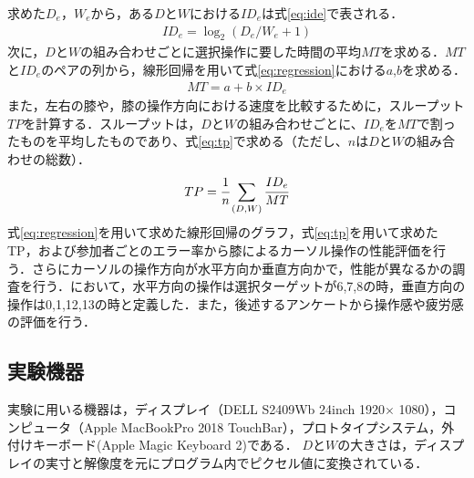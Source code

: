 \documentclass[submit, techrep]{ipsj}
\begin{document}
求めた$D_e$，$W_e$から，ある$D$と$W$における$ID_e$は式\ref{eq:ide}で表される．
\begin{eqnarray}
	ID_e = \log_2{(D_e/W_e + 1)}
	\label{eq:ide}
\end{eqnarray}
次に，$D$と$W$の組み合わせごとに選択操作に要した時間の平均$MT$を求める．$MT$と$ID_e$のペアの列から，線形回帰を用いて式\ref{eq:regression}における$a$,$b$を求める．
\begin{eqnarray}
	MT = a + b \times  ID_e
	\label{eq:regression}
\end{eqnarray}
また，左右の膝や，膝の操作方向における速度を比較するために，スループット$TP$を計算する．スループットは，$D$と$W$の組み合わせごとに、$ID_e$を$MT$で割ったものを平均したものであり、式\ref{eq:tp}で求める（ただし、$n$は$D$と$W$の組み合わせの総数）．
\begin{eqnarray}
	TP = \cfrac{1}{n} \sum_{(D,W)} \cfrac{ID_e}{MT}
	\label{eq:tp}
\end{eqnarray}
式\ref{eq:regression}を用いて求めた線形回帰のグラフ，式\ref{eq:tp}を用いて求めたTP，および参加者ごとのエラー率から膝によるカーソル操作の性能評価を行う．さらにカーソルの操作方向が水平方向か垂直方向かで，性能が異なるかの調査を行う．において，水平方向の操作は選択ターゲットが6,7,8の時，垂直方向の操作は0,1,12,13の時と定義した．また，後述するアンケートから操作感や疲労感の評価を行う．

\subsection{実験機器}
実験に用いる機器は，ディスプレイ（DELL S2409Wb 24inch 1920$\times$ 1080），コンピュータ（Apple MacBookPro 2018 TouchBar），プロトタイプシステム，外付けキーボード(Apple Magic Keyboard 2)である．
$D$と$W$の大きさは，ディスプレイの実寸と解像度を元にプログラム内でピクセル値に変換されている．
\end{document}
